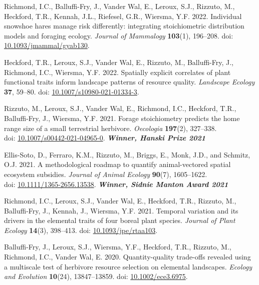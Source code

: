 \begin{etaremune}[topsep=0pt,itemsep=1pt,partopsep=0pt,parsep=0pt]
  \item Richmond, I.C., Balluffi-Fry, J., Vander Wal, E., Leroux, S.J., \textcolor{awesome}{Rizzuto, M.}, Heckford, T.R., Kennah, J.L., Riefesel, G.R., Wiersma, Y.F. 2022. Individual snowshoe hares manage risk differently: integrating stoichiometric distribution models and foraging ecology. \emph{Journal of Mammalogy} \textbf{103}(1), 196--208. doi: \href{https://academic.oup.com/jmammal/advance-article/doi/10.1093/jmammal/gyab130/6441781?guestAccessKey=8f89e422-7fb9-4ce9-a9dc-ccf46f3dd0cc}{10.1093/jmammal/gyab130}.
  \item Heckford, T.R., Leroux, S.J., Vander Wal, E., \textcolor{awesome}{Rizzuto, M.}, Balluffi-Fry, J., Richmond, I.C., Wiersma, Y.F. 2022. Spatially explicit correlates of plant functional traits inform landscape patterns of resource quality. \emph{Landscape Ecology} \textbf{37}, 59--80. doi: \href{https://doi.org/10.1007/s10980-021-01334-3}{10.1007/s10980-021-01334-3}.
  \item \textcolor{awesome}{Rizzuto, M.}, Leroux, S.J., Vander Wal, E., Richmond, I.C., Heckford, T.R., Balluffi-Fry, J., Wiersma, Y.F. 2021. Forage stoichiometry predicts the home range size of a small terrestrial herbivore. \emph{Oecologia} \textbf{197}(2), 327--338.\\ doi: \href{https://rdcu.be/cSX31}{10.1007/s00442-021-04965-0}. \null\hfill\textbf{\textit{Winner, Hanski Prize 2021}}
  \item Ellis-Soto, D.\textsuperscript{\textdagger}, Ferraro, K.M.\textsuperscript{\textdagger}, \textcolor{awesome}{Rizzuto, M.}, Briggs, E., Monk, J.D., and Schmitz, O.J. 2021. A methodological roadmap to quantify animal-vectored spatial ecosystem subsidies. \emph{Journal of Animal Ecology} \textbf{90}(7), 1605--1622.\\ doi: \href{https://doi.org/10.1111/1365-2656.13538}{10.1111/1365-2656.13538}. \null\hfill\textbf{\textit{Winner, Sidnie Manton Award 2021}}
  \item Richmond, I.C., Leroux, S.J., Vander Wal, E., Heckford, T.R., \textcolor{awesome}{Rizzuto, M.}, Balluffi-Fry, J., Kennah, J., Wiersma, Y.F. 2021. Temporal variation and its drivers in the elemental traits of four boreal plant species. \emph{Journal of Plant Ecology} \textbf{14}(3), 398--413. doi: \href{https://doi.org/10.1093/jpe/rtaa103}{10.1093/jpe/rtaa103}.
  \item Balluffi-Fry, J., Leroux, S.J., Wiersma, Y.F., Heckford, T.R., \textcolor{awesome}{Rizzuto, M.}, Richmond, I.C., Vander Wal, E. 2020. Quantity-quality trade-offs revealed using a multiscale test of herbivore resource selection on elemental landscapes. \emph{Ecology and Evolution} \textbf{10}(24), 13847--13859. doi: \href{https://doi.org/10.1002/ece3.6975}{10.1002/ece3.6975}.

\end{etaremune}
